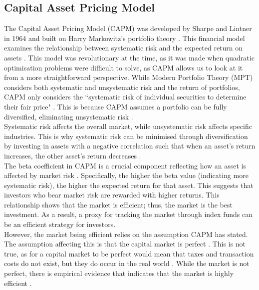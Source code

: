 \documentclass[12pt]{report}
\begin{document}
\subsection{Capital Asset Pricing Model} \label{capm}
The Capital Asset Pricing Model (CAPM) was developed by Sharpe and Lintner in 1964 and built on Harry Markowitz's portfolio theory \cite{textbook, elbannan2015capital}. This financial model examines the relationship between systematic risk and the expected return on assets \cite{source7}. This model was revolutionary at the time, as it was made when quadratic optimisation problems were difficult to solve, as CAPM allows us to look at it from a more straightforward perspective.
While Modern Portfolio Theory (MPT) considers both systematic and unsystematic risk and the return of portfolios, CAPM only considers the ``systematic risk of individual securities to determine their fair price" \cite{textbook}. This is because CAPM assumes a portfolio can be fully diversified, eliminating unsystematic risk \cite{textbook}.\\ \newline \noindent
Systematic risk affects the overall market, while unsystematic risk affects specific industries. This is why systematic risk can be minimised through diversification by investing in assets with a negative correlation such that when an asset's return increases, the other asset's return decreases \cite{textbook}.
\\ \newline \noindent
The beta coefficient in CAPM is a crucial component reflecting how an asset is affected by market risk \cite{textbook}. Specifically, the higher the beta value (indicating more systematic risk), the higher the expected return for that asset. This suggests that investors who bear market risk are rewarded with higher returns. This relationship shows that the market is efficient; thus, the market is the best investment. As a result, a proxy for tracking the market through index funds can be an efficient strategy for investors.
\\ \newline \noindent
However, the market being efficient relies on the assumption CAPM has stated. The assumption affecting this is that the capital market is perfect \cite{textbook}. This is not true, as for a capital market to be perfect would mean that taxes and transaction costs do not exist, but they do occur in the real world \cite{textbook}. While the market is not perfect, there is empirical evidence that indicates that the market is highly efficient \cite{textbook}.
\end{document}
